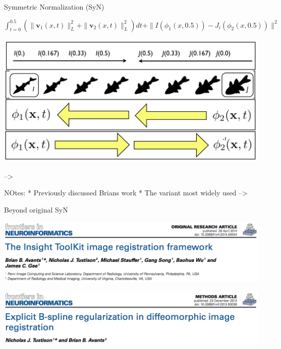 \documentclass[ignorenonframetext,]{beamer}
\begin{document}
\begin{frame}{Symmetric Normalization (SyN)}

\(\int_{t=0}^{0.5} \left(\|\mathbf{v}_1(x,t)\|_L^2 + \|\mathbf{v}_2(x,t)\|_L^2\right)dt + \|I\left(\phi_1(x,0.5)\right) - J_i\left(\phi_2(x,0.5)\right)\|^2\)

\includegraphics{./papers/figures/fishes.png}

--\textgreater{}

NOtes: * Previously discussed Brians work * The variant most widely used
--\textgreater{}

\end{frame}

\begin{frame}{Beyond original SyN}

\small

\includegraphics{./papers/figures/Frontiers_ITK.png}

\includegraphics{./papers/figures/Frontiers_BSplineSyN.png}

\end{frame}
\end{document}
